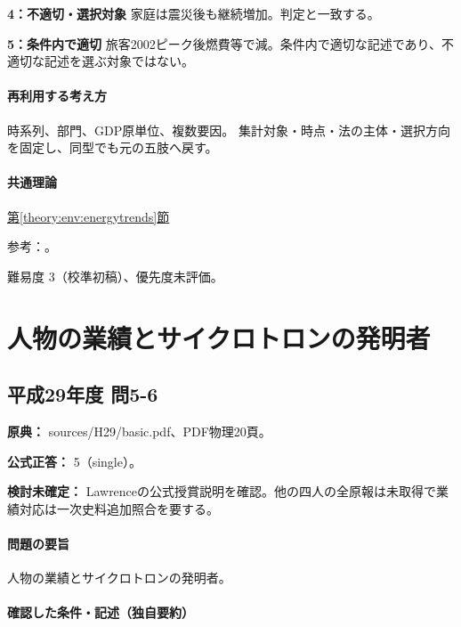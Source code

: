 \noindent\textbf{4：不適切・選択対象} 家庭は震災後も継続増加。判定と一致する。\par

\noindent\textbf{5：条件内で適切} 旅客2002ピーク後燃費等で減。条件内で適切な記述であり、不適切な記述を選ぶ対象ではない。\par

\paragraph{再利用する考え方} 時系列、部門、GDP原単位、複数要因。 集計対象・時点・法の主体・選択方向を固定し、同型でも元の五肢へ戻す。

\paragraph{共通理論} \hyperref[theory:env:energytrends]{第\ref*{theory:env:energytrends}節}

\par 参考：\cite{env59_energy2019}。

\par 難易度 3（校準初稿）、優先度未評価。

\section{人物の業績とサイクロトロンの発明者}

\subsection{平成29年度 問5-6}
\label{q:h29-reg-basic-5-6}

\noindent\textbf{原典：} sources/H29/basic.pdf、PDF物理20頁。

\textbf{公式正答：} 5（single）。

\par\textbf{検討未確定：} Lawrenceの公式授賞説明を確認。他の四人の全原報は未取得で業績対応は一次史料追加照合を要する。

\paragraph{問題の要旨} 人物の業績とサイクロトロンの発明者。

\paragraph{確認した条件・記述（独自要約）}\mbox{}\par

